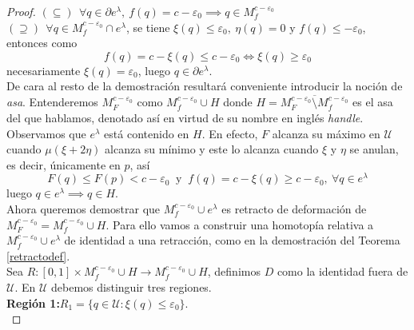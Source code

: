 \begin{proof}
    $\left( \subseteq \right) ~~\forall q\in \partial e^{\lambda},~f(q)=c-\varepsilon_0 \implies q\in M^{c-\varepsilon_0}_f$\\
    
    $\left( \supseteq \right) ~~\forall q\in M^{c-\varepsilon_0}_f\cap e^{\lambda}$, se tiene $\xi(q)\le\varepsilon_0,~\eta(q)=0 \text{ y } f(q)\le -\varepsilon_0$, entonces como
    \begin{equation*}
        f(q)=c-\xi(q)\le c-\varepsilon_0\iff \xi(q)\ge \varepsilon_0
    \end{equation*}
    \quad \quad necesariamente $\xi(q)=\varepsilon_0$, luego $q\in \partial e^{\lambda}$.\\ 

    De cara al resto de la demostración resultará conveniente introducir la noción de \textit{asa}. Entenderemos $M_F^{c-\varepsilon_0}$ como $M_f^{c-\varepsilon_0}\cup H$ donde $H=\overline{M_F^{c-\varepsilon_0}\setminus M_f^{c-\varepsilon_0}}$ es el asa del que hablamos, denotado así en virtud de su nombre en inglés \textit{handle}.\\
    
    Observamos que $e^{\lambda}$ está contenido en $H$. En efecto, $F$ alcanza su máximo en $\mathcal{U}$ cuando $\mu(\xi+2\eta)$ alcanza su mínimo y este lo alcanza cuando $\xi$ y $\eta$ se anulan, es decir, únicamente en $p$, así
    \begin{equation*}
        F(q)\le F(p)<c-\varepsilon_0 ~\text{ y }~f(q)=c-\xi(q)\ge c-\varepsilon_0,~\forall q\in e^{\lambda}
    \end{equation*}
    luego $q\in e^{\lambda}\implies q\in H$.\\

    
    Ahora queremos demostrar que $M^{c-\varepsilon_0}_f\cup e^{\lambda}$ es retracto de deformación de $M^{c-\varepsilon_0}_F = M_f^{c-\varepsilon_0}\cup H$. Para ello vamos a construir una homotopía relativa a $M^{c-\varepsilon_0}_f\cup e^{\lambda}$ de identidad a una retracción, como en la demostración del Teorema \ref{retractodef}.\\

    Sea $R:[0,1]\times M_f^{c-\varepsilon_0}\cup H\to M_f^{c-\varepsilon_0}\cup H$, definimos $D$ como la identidad fuera de $\mathcal{U}$. En $\mathcal{U}$ debemos distinguir tres regiones.\\

    \textbf{Región 1:}\quad $R_1=\{q\in\mathcal{U}:\xi(q)\le \varepsilon_0\}$.\\
    

\end{proof}
